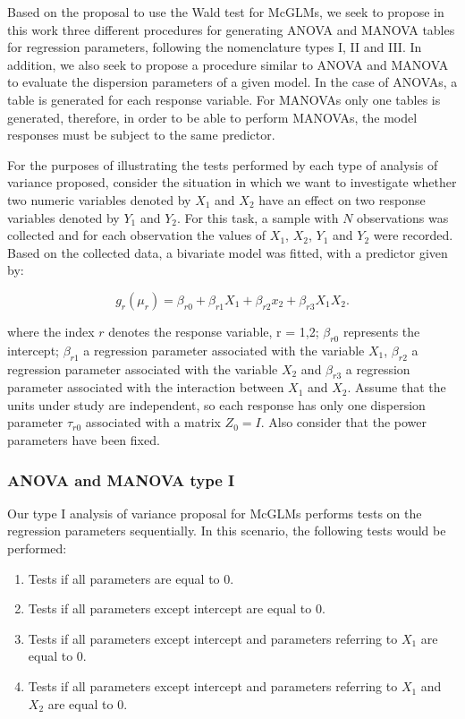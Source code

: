 \documentclass[AMA,STIX1COL]{WileyNJD-v2}
\begin{document}
Based on the proposal to use the Wald test for McGLMs, we seek to propose in this work three different procedures for generating ANOVA and MANOVA tables for regression parameters, following the nomenclature types I, II and III. In addition, we also seek to propose a procedure similar to ANOVA and MANOVA to evaluate the dispersion parameters of a given model. In the case of ANOVAs, a table is generated for each response variable. For MANOVAs only one tables is generated, therefore, in order to be able to perform MANOVAs, the model responses must be subject to the same predictor.

For the purposes of illustrating the tests performed by each type of analysis of variance proposed, consider the situation in which we want to investigate whether two numeric variables denoted by $X_1$ and $X_2$ have an effect on two response variables denoted by $Y_1$ and $Y_2$. For this task, a sample with $N$ observations was collected and for each observation the values of $X_1$, $X_2$, $Y_1$ and $Y_2$ were recorded. Based on the collected data, a bivariate model was fitted, with a predictor given by:

$$
g_r(\mu_r) = \beta_{r0} + \beta_{r1} X_1 + \beta_{r2} x_2 + \beta_{r3} X_1X_2.
$$

\noindent where the index $r$ denotes the response variable, r = 1,2; $\beta_{r0}$ represents the intercept; $\beta_{r1}$ a regression parameter associated with the variable $X_1$, $\beta_{r2}$ a regression parameter associated with the variable $X_2$ and $\beta_{r3}$ a regression parameter associated with the interaction between $X_1$ and $X_2$. Assume that the units under study are independent, so each response has only one dispersion parameter $\tau_{r0}$ associated with a matrix $Z_0 = I$. Also consider that the power parameters have been fixed.

\subsubsection{ANOVA and MANOVA type I}

Our type I analysis of variance proposal for McGLMs performs tests on the regression parameters sequentially. In this scenario, the following tests would be performed:

\begin{enumerate}
   \item Tests if all parameters are equal to 0.
   \item Tests if all parameters except intercept are equal to 0.
   \item Tests if all parameters except intercept and parameters referring to $X_1$ are equal to 0.
   \item Tests if all parameters except intercept and parameters referring to $X_1$ and $X_2$ are equal to 0.
\end{enumerate}
\end{document}
